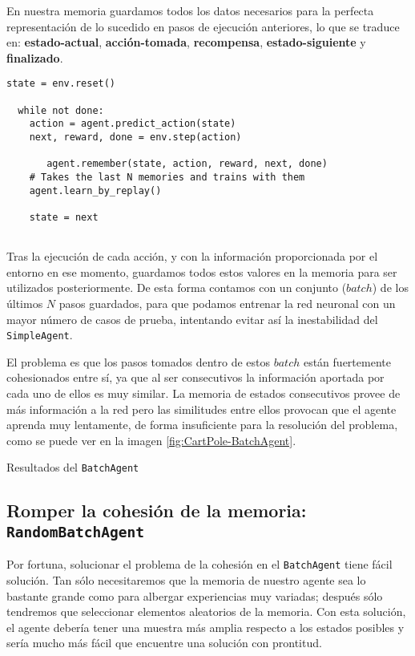 En nuestra memoria guardamos todos los datos necesarios para la perfecta representación de lo sucedido en pasos de ejecución anteriores, lo que se traduce en: \textbf{estado-actual}, \textbf{acción-tomada}, \textbf{recompensa}, \textbf{estado-siguiente} y \textbf{finalizado}.

\begin{minipage}{0.9\linewidth}%
\begin{lstlisting}[frame=tb, caption=Pseudocódigo BatchAgent, inputencoding=latin1, label=code:cartpole_drl2]
  state = env.reset()

  while not done:
    action = agent.predict_action(state)
    next, reward, done = env.step(action)

       agent.remember(state, action, reward, next, done)
    # Takes the last N memories and trains with them
    agent.learn_by_replay()

    state = next
              
\end{lstlisting}%
\end{minipage}

Tras la ejecución de cada acción, y con la información proporcionada por el entorno en ese momento, guardamos todos estos valores en la memoria para ser utilizados posteriormente. De esta forma contamos con un conjunto ($batch$) de los últimos $N$ pasos guardados, para que podamos entrenar la red neuronal con un mayor número de casos de prueba, intentando evitar así la inestabilidad del \texttt{SimpleAgent}.

El problema es que los pasos tomados dentro de estos $batch$ están fuertemente cohesionados entre sí, ya que al ser consecutivos la información aportada por cada uno de ellos es muy similar. La memoria de estados consecutivos provee de más información a la red pero las similitudes entre ellos provocan que el agente aprenda muy lentamente, de forma insuficiente para la resolución del problema, como se puede ver en la imagen \ref{fig:CartPole-BatchAgent}.

%
       {Resultados del \texttt{BatchAgent}}


\subsection{Romper la cohesión de la memoria: \texttt{RandomBatchAgent}}
\label{sec:cartpoledqn3}

Por fortuna, solucionar el problema de la cohesión en el \texttt{BatchAgent} tiene fácil solución. Tan sólo necesitaremos que la memoria de nuestro agente sea lo bastante grande como para albergar experiencias muy variadas; después sólo tendremos que seleccionar elementos aleatorios de la memoria. Con esta solución, el agente debería tener una muestra más amplia respecto a los estados posibles y sería mucho más fácil que encuentre una solución con prontitud.
  
